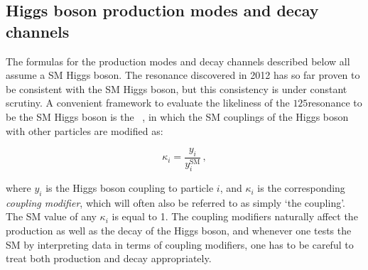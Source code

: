 \subsection{Higgs boson production modes and decay channels}
\label{sec:production-decay}

The formulas for the production modes and decay channels described below all assume a SM Higgs boson.
% 
The resonance discovered in 2012 has so far proven to be consistent with the SM Higgs boson, but this consistency is under constant scrutiny.
% 
A convenient framework to evaluate the likeliness of the $125$\GeV resonance to be the SM Higgs boson is the \textit{\kappaframework}~\cite{LHCHXSWG:YR3}, in which the SM couplings of the Higgs boson with other particles are modified as:
% 
\begin{linenomath*}
\begin{equation}
\kappa_{i} = \frac{y_{i}}{y_{i}^{\text{SM}}}\,,
\end{equation}
\end{linenomath*}
% 
where $y_i$ is the Higgs boson coupling to particle $i$, and $\kappa_i$ is the corresponding \textit{coupling modifier}, which will often also be referred to as simply `the coupling'.
% 
The SM value of any $\kappa_i$ is equal to 1.
% 
The coupling modifiers naturally affect the production as well as the decay of the Higgs boson, and whenever one tests the SM by interpreting data in terms of coupling modifiers, one has to be careful to treat both production and decay appropriately.


